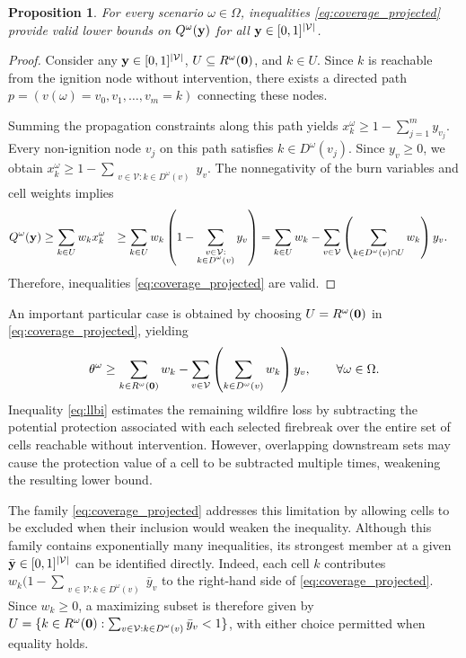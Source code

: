 \documentclass{itor}
\newtheorem{proposition}{Proposition}
\begin{document}
\begin{proposition}
\label{prop:coverage_validity}
For every scenario $\omega \in \Omega$, inequalities
\eqref{eq:coverage_projected} provide valid lower bounds
on $Q^\omega(\vb{y})$ for all
$\vb{y} \in [0,1]^{|\mathcal{V}|}$.
\end{proposition}

\begin{proof}
Consider any $\vb{y} \in [0,1]^{|\mathcal{V}|}$,
$U \subseteq R^\omega(\vb{0})$, and $k \in U$.
Since $k$ is reachable from the ignition node without
intervention, there exists a directed path
$p=(v(\omega)=v_0,v_1,\ldots,v_m=k)$ connecting these
nodes.

Summing the propagation constraints along this path yields  $x_k^\omega \geq
1-\sum_{j=1}^{m}y_{v_j}$. Every non-ignition node $v_j$ on this path satisfies
$k \in D^\omega(v_j)$. Since $y_v \geq 0$, we obtain $x_k^\omega \geq
1-\sum_{\substack{v \in \mathcal{V}: k \in D^\omega(v)}}y_v$. The nonnegativity of the burn variables and cell weights implies
\begin{align*}
Q^\omega(\vb{y})
&\geq
\sum_{k \in U}w_k x_k^\omega
\nonumber
&\geq
\sum_{k \in U}w_k
\left(
1-
\sum_{\substack{v \in \mathcal{V}:\\
k \in D^\omega(v)}}y_v
\right)
\nonumber
&=
\sum_{k \in U}w_k
-
\sum_{v \in \mathcal{V}}
\left(
\sum_{k \in D^\omega(v)\cap U}w_k
\right)y_v.
\end{align*}
Therefore, inequalities \eqref{eq:coverage_projected}
are valid.
\end{proof}

An important particular case is obtained by choosing $U=R^\omega(\vb{0})$ in \eqref{eq:coverage_projected}, yielding
\begin{equation}
\label{eq:llbi}
\theta^\omega \geq
\sum_{k \in R^\omega(\vb{0})} w_k
-
\sum_{v \in \mathcal{V}}
\left(
\sum_{k \in D^\omega(v)} w_k
\right)y_v,
\qquad \forall \omega \in \Omega.
\end{equation}
Inequality \eqref{eq:llbi} estimates the remaining wildfire loss by subtracting the potential protection associated with each selected firebreak over the entire set of cells reachable without intervention. However, overlapping downstream sets may cause the protection value of a cell to be subtracted multiple times, weakening the resulting lower bound.

The family \eqref{eq:coverage_projected} addresses this limitation by allowing cells to be excluded when their inclusion would weaken the inequality. Although this family contains exponentially many inequalities, its strongest member at a given $\bar{\vb{y}} \in [0,1]^{|\mathcal{V}|}$ can be identified directly. Indeed, each cell $k$ contributes $w_k(1- \sum_{\substack{v \in \mathcal{V}: k \in D^\omega(v)}}\bar{y}_v$ to the right-hand side of \eqref{eq:coverage_projected}. Since $w_k \geq 0$, a maximizing subset is therefore given by  $U = \{
k \in R^\omega(\vb{0}) :
\sum_{\substack{v \in \mathcal{V}: k \in D^\omega(v)}}\bar{y}_v < 1
\}$, with either choice permitted when equality holds.
\end{document}
